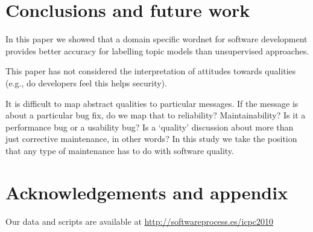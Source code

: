 \documentclass[10pt, conference, compsocconf]{IEEEtran}
\begin{document}
\section{Conclusions and future work}
In this paper we showed that a domain specific wordnet for software development provides better accuracy for labelling topic models than unsupervised approaches.

This paper has not considered the interpretation of attitudes towards qualities (e.g., do developers feel this helps security).

It is difficult to map abstract qualities to particular messages. If the message is about a particular bug fix, do we map that to reliability? Maintainability? Is it a performance bug or a usability bug? Is a `quality' discussion about more than just corrective maintenance, in other words? In this study we take the position that any type of maintenance has to do with software quality.

\section{Acknowledgements and appendix}
Our data and scripts are available at \url{http://softwareprocess.es/icpc2010}



\end{document}
